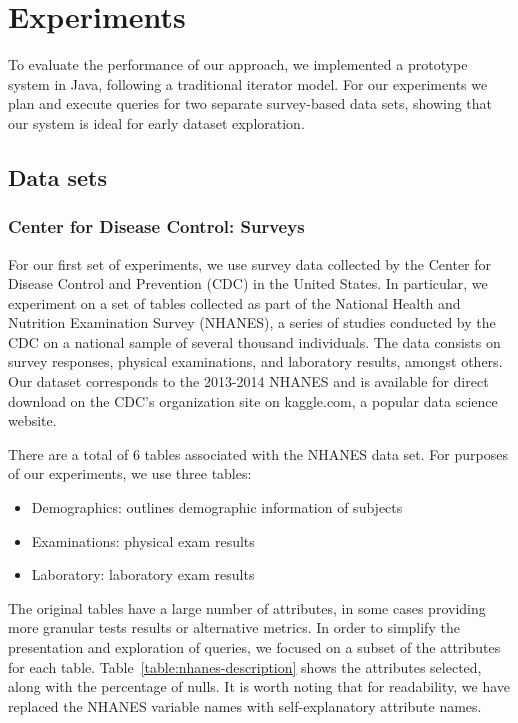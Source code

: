 \section{Experiments}
To evaluate the performance of our approach,  we implemented
a prototype system in Java, following a traditional iterator model.
For our experiments we plan and execute queries
for two separate survey-based data sets, showing that our system
is ideal for early dataset exploration.

\subsection{Data sets} \label{subsec:datasets}
\subsubsection{Center for Disease Control: Surveys}
For our first set of experiments, we use survey data collected by the 
Center for Disease Control and Prevention (CDC) in the United States. In particular, we
experiment on a set of tables collected as part of the National
Health and Nutrition Examination Survey (NHANES), a series of studies
conducted by the CDC on a national sample of several thousand individuals\cite{cdc-data}.
The data consists on survey responses, physical examinations, and laboratory
results, amongst others. Our dataset corresponds to the 2013-2014 NHANES
and is available for direct download on the CDC's organization site on 
kaggle.com, a popular data science website.

There are a total of 6 tables associated with the NHANES data set. For purposes
of our experiments, we use three tables:

\begin{itemize}
	\item Demographics: outlines demographic information of subjects
	\item Examinations: physical exam results
	\item Laboratory: laboratory exam results
\end{itemize}

The original tables have a large number of attributes, in some cases providing more granular
tests results or alternative metrics. In order to simplify the presentation and
exploration of queries, we focused on a subset of the attributes for each table.
Table~\ref{table:nhanes-description} shows the attributes selected, along with the
percentage of nulls. It is worth noting that for readability, we have replaced the
NHANES variable names with self-explanatory attribute names.

